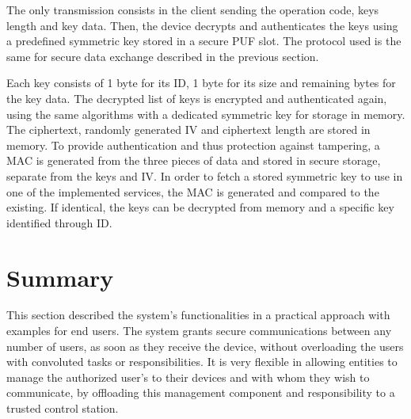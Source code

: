 The only transmission consists in the client sending the operation code, keys length and key data. Then, the device decrypts and authenticates the keys using a predefined symmetric key stored in a secure PUF slot. The protocol used is the same for secure data exchange described in the previous section.

Each key consists of 1 byte for its ID, 1 byte for its size and remaining bytes for the key data.
The decrypted list of keys is encrypted and authenticated again, using the same algorithms with a dedicated symmetric key for storage in memory. The ciphertext, randomly generated IV and ciphertext length are stored in memory. To provide authentication and thus protection against tampering, a \ac{MAC} is generated from the three pieces of data and stored in secure storage, separate from the keys and IV.
In order to fetch a stored symmetric key to use in one of the implemented services, the \ac{MAC} is generated and compared to the existing. If identical, the keys can be decrypted from memory and a specific key identified through ID.




\section{Summary}\label{chap:arch:summary}

This section described the system's functionalities in a practical approach with examples for end users.
The system grants secure communications between any number of users, as soon as they receive the device, without overloading the users with convoluted tasks or responsibilities.
It is very flexible in allowing entities to manage the authorized user's to their devices and with whom they wish to communicate, by offloading this management component and responsibility to a trusted control station.
